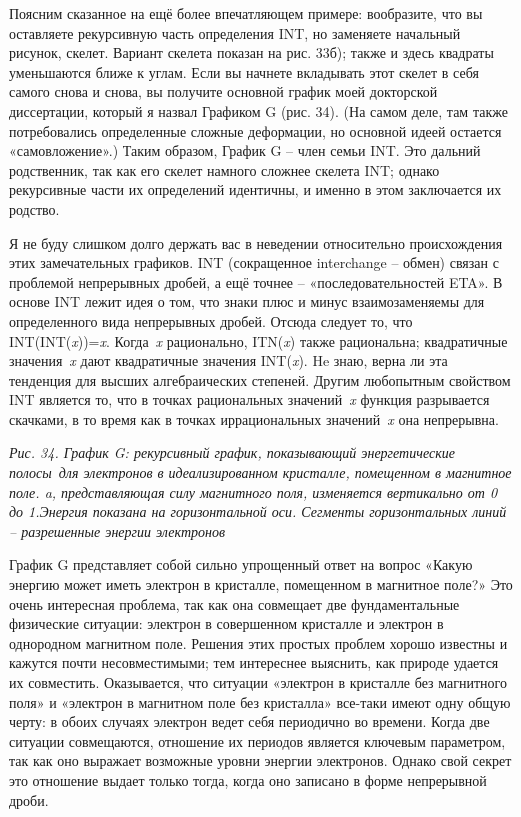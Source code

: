 \documentclass[../main.tex]{subfiles}
\begin{document}
Поясним сказанное на ещё более впечатляющем примере: вообразите, что вы оставляете рекурсивную часть определения INT, но заменяете начальный рисунок, скелет. Вариант скелета показан на рис. 33б); также и здесь квадраты уменьшаются ближе к углам. Если вы начнете вкладывать этот скелет в себя самого снова и снова, вы получите основной график моей докторской диссертации, который я назвал Графиком G (рис. 34). (На самом деле, там также потребовались определенные сложные деформации, но основной идеей остается «самовложение».) Таким образом, График G \--- член семьи INT\@. Это дальний родственник, так как его скелет намного сложнее скелета INT; однако рекурсивные части их определений идентичны, и именно в этом заключается их родство.

Я не буду слишком долго держать вас в неведении относительно происхождения этих замечательных графиков. INT (сокращенное interchange \--- обмен) связан с проблемой непрерывных дробей, а ещё точнее \--- «последовательностей ETA». В основе INT лежит идея о том, что знаки плюс и минус взаимозаменяемы для определенного вида непрерывных дробей. Отсюда следует то, что INT(INT(\emph{x}))=\emph{x}. Когда~\emph{x} рационально, ITN(\emph{x}) также рациональна; квадратичные значения~\emph{x} дают квадратичные значения INT(\emph{x}). He знаю, верна ли эта тенденция для высших алгебраических степеней. Другим любопытным свойством INT является то, что в точках рациональных значений~\emph{x} функция разрывается скачками, в то время как в точках иррациональных значений~\emph{x} она непрерывна.

\emph{Рис. 34. График G: рекурсивный график, показывающий энергетические полосы~для электронов в идеализированном кристалле, помещенном в магнитное поле. a, представляющая силу магнитного поля, изменяется вертикально от 0 до 1.Энергия показана на горизонтальной оси. Сегменты горизонтальных линий \--- разрешенные энергии электронов}

График G представляет собой сильно упрощенный ответ на вопрос «Какую энергию может иметь электрон в кристалле, помещенном в магнитное поле?» Это очень интересная проблема, так как она совмещает две фундаментальные физические ситуации: электрон в совершенном кристалле и электрон в однородном магнитном поле. Решения этих простых проблем хорошо известны и кажутся почти несовместимыми; тем интереснее выяснить, как природе удается их совместить. Оказывается, что ситуации «электрон в кристалле без магнитного поля» и «электрон в магнитном поле без кристалла» все-таки имеют одну общую черту: в обоих случаях электрон ведет себя периодично во времени. Когда две ситуации совмещаются, отношение их периодов является ключевым параметром, так как оно выражает возможные уровни энергии электронов. Однако свой секрет это отношение выдает только тогда, когда оно записано в форме непрерывной дроби.
\end{document}

